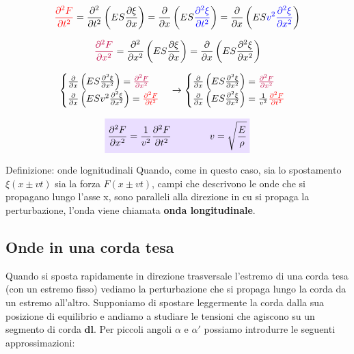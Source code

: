 \documentclass[x11names]{article}
\newcommand{\viola}[1]{\colorbox{myred}{$\displaystyle #1$}}
\begin{document}
	\[ 
	\textcolor{red}{\frac{\partial^2F}{\partial t^2}} = \frac{\partial^2}{\partial t^2} \left(ES\frac{\partial\xi}{\partial x}\right) = \frac{\partial}{\partial x} \left(ES\textcolor{blue}{\frac{\partial^2\xi}{\partial t^2}}\right) = \frac{\partial}{\partial x} \left(ES\textcolor{blue}{v^2\frac{\partial^2\xi}{\partial x^2}}\right) 
	\]
	
	\[ 
	\textcolor{purple}{\frac{\partial^2F}{\partial x^2}} = \frac{\partial^2}{\partial x^2} \left(ES\frac{\partial\xi}{\partial x}\right) = \frac{\partial}{\partial x} \left(ES\frac{\partial^2\xi}{\partial x^2}\right)
	\]
	
	\[ 
	\begin{cases}
		\frac{\partial}{\partial x} \left(ES\frac{\partial^2\xi}{\partial x^2}\right) = \textcolor{purple}{\frac{\partial^2F}{\partial x^2}} \\
		\frac{\partial}{\partial x} \left(ESv^2\frac{\partial^2\xi}{\partial x^2}\right)  =  \textcolor{red}{\frac{\partial^2F}{\partial t^2}}
	\end{cases} \to 
	\begin{cases}
		\frac{\partial}{\partial x} \left(ES\frac{\partial^2\xi}{\partial x^2}\right) = \textcolor{purple}{\frac{\partial^2F}{\partial x^2}} \\
		\frac{\partial}{\partial x} \left(ES\frac{\partial^2\xi}{\partial x^2}\right)  = \frac{1}{v^2} \textcolor{red}{\frac{\partial^2F}{\partial t^2}}
	\end{cases}
	\]
	

	\begin{equation}
		\viola{\frac{\partial^2F}{\partial x^2} = \frac{1}{v^2} \frac{\partial^2 F}{\partial t^2} \qquad \qquad v = \sqrt{\frac{E}{\rho}}}
	\end{equation}

	
	\begin{center}
		\colorbox{myblue}{\begin{minipage}{5.75in}
				\begin{blues}{Definizione: onde lognitudinali}
					Quando, come in questo caso, sia lo spostamento \(\xi(x\pm vt)\) sia la forza \(F(x\pm vt)\), campi che descrivono le onde che si propagano lungo l'asse x, sono paralleli alla direzione in cu si propaga la perturbazione, l'onda viene chiamata \textbf{onda longitudinale}.
				\end{blues}
		\end{minipage}}
	\end{center}
	
\newpage
\subsection{Onde in una corda tesa}
	Quando si sposta rapidamente in direzione trasversale l'estremo di una corda tesa (con un estremo fisso) vediamo la perturbazione che si propaga lungo la corda da un estremo all'altro. Supponiamo di spostare leggermente la corda dalla sua posizione di equilibrio e andiamo a studiare le tensioni che agiscono su un segmento di corda \(\mathbf{dl}\). Per piccoli angoli \(\alpha\) e \(\alpha'\) possiamo introdurre le seguenti approssimazioni:
	
\end{document}
